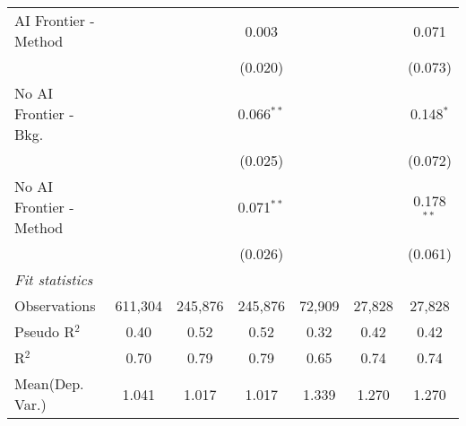 \begin{tabular}{lcccccc}
   AI Frontier - Method    &               &               & 0.003         &               &               & 0.071\\   
                           &               &               & (0.020)       &               &               & (0.073)\\   
   No AI Frontier - Bkg.   &               &               & 0.066$^{**}$  &               &               & 0.148$^{*}$\\   
                           &               &               & (0.025)       &               &               & (0.072)\\   
   No AI Frontier - Method &               &               & 0.071$^{**}$  &               &               & 0.178$^{**}$\\   
                           &               &               & (0.026)       &               &               & (0.061)\\   
   \midrule
   \emph{Fit statistics}\\
   Observations            & 611,304       & 245,876       & 245,876       & 72,909        & 27,828        & 27,828\\  
   Pseudo R$^2$            & 0.40          & 0.52          & 0.52          & 0.32          & 0.42          & 0.42\\  
   R$^2$                   & 0.70          & 0.79          & 0.79          & 0.65          & 0.74          & 0.74\\  
Mean(Dep. Var.) & 1.041 & 1.017 & 1.017 & 1.339 & 1.270 & 1.270 \\
   

\end{tabular}
